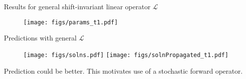 \begin{frame}{Results for general shift-invariant linear operator $\mathcal{L}$}
  \begin{figure}[h]
    \centering
    \texttt{[image: figs/params\_t1.pdf]}
  \end{figure}
\end{frame}

\begin{frame}{Predictions with general $\mathcal{L}$}
  \begin{figure}[h]
    \centering
    \texttt{[image: figs/solns.pdf]}
    \texttt{[image: figs/solnPropagated\_t1.pdf]}
  \end{figure}
  Prediction could be better.  This motivates use of a stochastic forward
  operator.
\end{frame}


